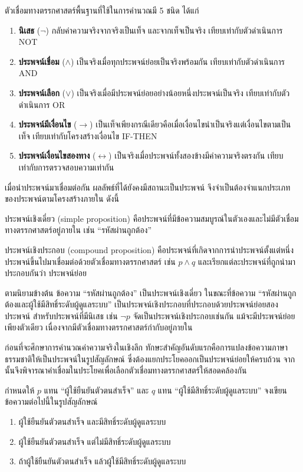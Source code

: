 ตัวเชื่อมทางตรรกศาสตร์พื้นฐานที่ใช้ในการคำนวณมี 5 ชนิด ได้แก่

\begin{enumerate}
    \item \textbf{นิเสธ} ($\neg$) กลับค่าความจริงจากจริงเป็นเท็จ และจากเท็จเป็นจริง เทียบเท่ากับตัวดำเนินการ NOT
    \item \textbf{ประพจน์เชื่อม} ($\land$) เป็นจริงเมื่อทุกประพจน์ย่อยเป็นจริงพร้อมกัน เทียบเท่ากับตัวดำเนินการ AND
    \item \textbf{ประพจน์เลือก} ($\lor$) เป็นจริงเมื่อมีประพจน์ย่อยอย่างน้อยหนึ่งประพจน์เป็นจริง เทียบเท่ากับตัวดำเนินการ OR
    \item \textbf{ประพจน์มีเงื่อนไข} ($\rightarrow$) เป็นเท็จเพียงกรณีเดียวคือเมื่อเงื่อนไขนำเป็นจริงแต่เงื่อนไขตามเป็นเท็จ เทียบเท่ากับโครงสร้างเงื่อนไข IF-THEN
    \item \textbf{ประพจน์เงื่อนไขสองทาง} ($\leftrightarrow$) เป็นจริงเมื่อประพจน์ทั้งสองข้างมีค่าความจริงตรงกัน เทียบเท่ากับการตรวจสอบความเท่ากัน
\end{enumerate}

เมื่อนำประพจน์มาเชื่อมต่อกัน ผลลัพธ์ที่ได้ยังคงมีสถานะเป็นประพจน์ จึงจำเป็นต้องจำแนกประเภทของประพจน์ตามโครงสร้างภายใน ดังนี้

\begin{definition}
ประพจน์เชิงเดี่ยว (simple proposition) คือประพจน์ที่มีข้อความสมบูรณ์ในตัวเองและไม่มีตัวเชื่อมทางตรรกศาสตร์อยู่ภายใน เช่น ``รหัสผ่านถูกต้อง''

ประพจน์เชิงประกอบ (compound proposition) คือประพจน์ที่เกิดจากการนำประพจน์ตั้งแต่หนึ่งประพจน์ขึ้นไปมาเชื่อมต่อด้วยตัวเชื่อมทางตรรกศาสตร์ เช่น $p \land q$ และเรียกแต่ละประพจน์ที่ถูกนำมาประกอบกันว่า ประพจน์ย่อย
\end{definition}

ตามนิยามข้างต้น ข้อความ ``รหัสผ่านถูกต้อง'' เป็นประพจน์เชิงเดี่ยว ในขณะที่ข้อความ ``รหัสผ่านถูกต้องและผู้ใช้มีสิทธิ์ระดับผู้ดูแลระบบ'' เป็นประพจน์เชิงประกอบที่ประกอบด้วยประพจน์ย่อยสองประพจน์ สำหรับประพจน์ที่มีนิเสธ เช่น $\neg p$ จัดเป็นประพจน์เชิงประกอบเช่นกัน แม้จะมีประพจน์ย่อยเพียงตัวเดียว เนื่องจากมีตัวเชื่อมทางตรรกศาสตร์กำกับอยู่ภายใน

ก่อนที่จะศึกษาการคำนวณค่าความจริงในเชิงลึก ทักษะสำคัญอันดับแรกคือการแปลงข้อความภาษาธรรมชาติให้เป็นประพจน์ในรูปสัญลักษณ์ ซึ่งต้องแยกประโยคออกเป็นประพจน์ย่อยให้ครบถ้วน จากนั้นจึงพิจารณาคำเชื่อมในประโยคเพื่อเลือกตัวเชื่อมทางตรรกศาสตร์ให้สอดคล้องกัน

\begin{ex}
\label{ex:symbolize-condition}
กำหนดให้ $p$ แทน ``ผู้ใช้ยืนยันตัวตนสำเร็จ'' และ $q$ แทน ``ผู้ใช้มีสิทธิ์ระดับผู้ดูแลระบบ'' จงเขียนข้อความต่อไปนี้ในรูปสัญลักษณ์
\begin{enumerate}
    \item ผู้ใช้ยืนยันตัวตนสำเร็จ และมีสิทธิ์ระดับผู้ดูแลระบบ
    \item ผู้ใช้ยืนยันตัวตนสำเร็จ แต่ไม่มีสิทธิ์ระดับผู้ดูแลระบบ
    \item ถ้าผู้ใช้ยืนยันตัวตนสำเร็จ แล้วผู้ใช้มีสิทธิ์ระดับผู้ดูแลระบบ
\end{enumerate}
\end{ex}

